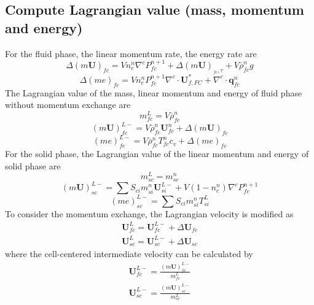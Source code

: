 \documentclass[preprint,12pt]{elsarticle}
\begin{document}
\subsection{\textsf{Compute Lagrangian value (mass, momentum and energy)}}
For the fluid phase, the linear momentum rate, the energy rate are
\begin{equation}
 \Delta (m \pmb{U})_{fc} = V n_c^n \nabla^c P_{fc}^{n+1} +\Delta (m \pmb{U})_{_{fc},\tau} + V \overline{\rho}_{fc}^n g
\end{equation}
%
%
\begin{equation}
 \Delta (me)_{fc} = V n_c^n P_{fc}^{n+1} \nabla^c \cdot \pmb{U}_{f,FC}^{*} + \nabla^c \cdot \pmb{q}_{fc}^n
\end{equation}
%
%
The Lagrangian value of the mass, linear momentum and energy of fluid phase without momentum exchange are
%
%
\begin{equation}
 m_{fc}^L = V \overline{\rho}_{fc}^n 
\end{equation}
%
%
\begin{equation}
 (m \pmb{U})_{fc}^{L-} = V \overline{\rho}_{fc}^n \pmb{U}_{fc}^n + \Delta (m \pmb{U})_{fc} 
\end{equation}
%
%
\begin{equation}
 (me)_{fc}^{L-} = V \overline{\rho}_{fc}^n T_{fc}^n    c_v + \Delta (me)_{fc} 
\end{equation}
%
%
For the solid phase, the Lagrangian value of the linear momentum and energy of solid phase are
%
\begin{equation}
 m_{sc}^L = m_{sc}^n
\end{equation}
%
\begin{equation}
 (m \pmb{U})_{sc}^{L-} = \sum{S_{ci} m_{si}^n \pmb{U}_{si}^{L-}} + V (1-n_c^n) \nabla^c P_{fc}^{n+1}
\end{equation}
%
\begin{equation}
 (me)_{sc}^{L-} =  \sum{S_{ci} m_{si}^n T_{si}^L}
\end{equation}
%
%
To consider the momentum exchange, the Lagrangian velocity is modified as
%
\begin{equation}
\begin{gathered}
\pmb{U}_{fc}^{L} = \pmb{U}_{fc}^{L-} + \Delta \pmb{U}_{fc} \\
\pmb{U}_{sc}^{L} = \pmb{U}_{sc}^{L-} + \Delta \pmb{U}_{sc}
\end{gathered}
\end{equation}
%
%
where the cell-centered intermediate velocity can be calculated by
%
\begin{equation}
\begin{gathered}
\pmb{U}_{fc}^{L-} = \frac{(m \pmb{U})_{fc}^{L-}}{m_{fc}^L} \\
\pmb{U}_{sc}^{L-} = \frac{(m \pmb{U})_{sc}^{L-}}{m_{sc}^L} 
\end{gathered}
\end{equation}
\end{document}

